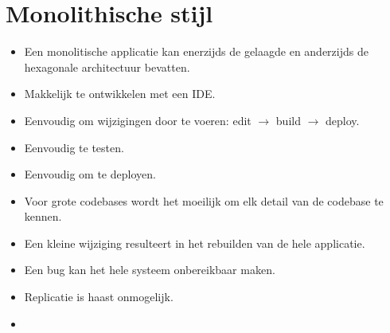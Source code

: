 	\section{Monolithische stijl}
		\begin{itemize}
			\item[\info] Een monolitische applicatie kan enerzijds de gelaagde en anderzijds de hexagonale architectuur bevatten.
			\item[\good] Makkelijk te ontwikkelen met een IDE.
			\item[\good] Eenvoudig om wijzigingen door te voeren: edit $\rightarrow$ build $\rightarrow$ deploy.
			\item[\good] Eenvoudig te testen.
			\item[\good] Eenvoudig om te deployen.
			\item[\alert] Voor grote codebases wordt het moeilijk om elk detail van de codebase te kennen.
			\item[\alert] Een kleine wijziging resulteert in het rebuilden van de hele applicatie.
			\item[\alert] Een bug kan het hele systeem onbereikbaar maken.
			\item[\alert] Replicatie is haast onmogelijk. 
			\item[\alert] 
		\end{itemize}
